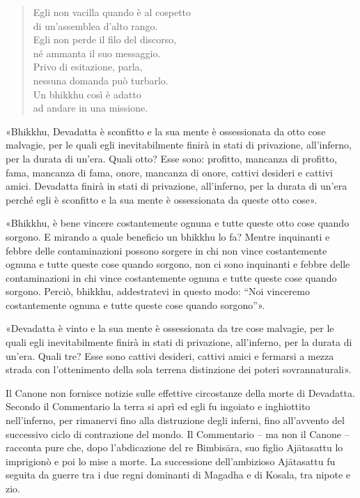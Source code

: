 \begin{quote}
Egli non vacilla quando è al cospetto \\
di un’assemblea d’alto rango. \\
Egli non perde il filo del discorso, \\
né ammanta il suo messaggio. \\
Privo di esitazione, parla, \\
nessuna domanda può turbarlo. \\
Un bhikkhu così è adatto \\
ad andare in una missione.
\end{quote}


«Bhikkhu, Devadatta è sconfitto e la sua mente è ossessionata da otto cose
malvagie, per le quali egli inevitabilmente finirà in stati di privazione,
all’inferno, per la durata di un’era. Quali otto? Esse sono: profitto, mancanza
di profitto, fama, mancanza di fama, onore, mancanza di onore, cattivi desideri
e cattivi amici. Devadatta finirà in stati di privazione, all’inferno, per la
durata di un’era perché egli è sconfitto e la sua mente è ossessionata da queste
otto cose».

«Bhikkhu, è bene vincere costantemente ognuna e tutte queste otto cose quando
sorgono. E mirando a quale beneficio un bhikkhu lo fa? Mentre inquinanti e
febbre delle contaminazioni possono sorgere in chi non vince costantemente
ognuna e tutte queste cose quando sorgono, non ci sono inquinanti e febbre delle
contaminazioni in chi vince costantemente ognuna e tutte queste cose quando
sorgono. Perciò, bhikkhu, addestratevi in questo modo: “Noi vinceremo
costantemente ognuna e tutte queste cose quando sorgono”».

«Devadatta è vinto e la sua mente è ossessionata da tre cose malvagie, per le
quali egli inevitabilmente finirà in stati di privazione, all’inferno, per la
durata di un’era. Quali tre? Esse sono cattivi desideri, cattivi amici e
fermarsi a mezza strada con l’ottenimento della sola terrena distinzione dei
poteri sovrannaturali».


 Il Canone non fornisce notizie sulle effettive
circostanze della morte di Devadatta. Secondo il Commentario la terra si aprì ed
egli fu ingoiato e inghiottito nell’inferno, per rimanervi fino alla distruzione
degli inferni, fino all’avvento del successivo ciclo di contrazione del mondo.
Il Commentario – ma non il Canone – racconta pure che, dopo l’abdicazione del re
Bimbisāra, suo figlio Ajātasattu lo imprigionò e poi lo mise a morte. La
successione dell’ambizioso Ajātasattu fu seguita da guerre tra i due regni
dominanti di Magadha e di Kosala, tra nipote e zio.

